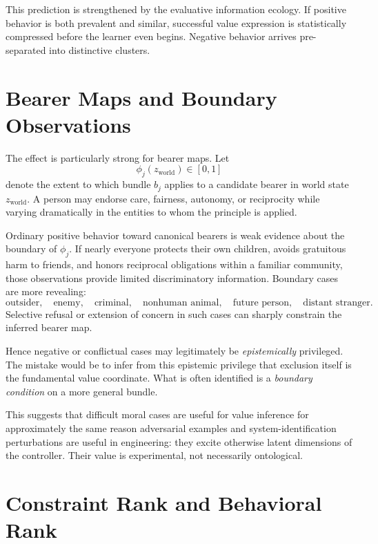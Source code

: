 \documentclass[11pt]{article}
\begin{document}
This prediction is strengthened by the evaluative information ecology. If positive behavior is both prevalent and similar, successful value expression is statistically compressed before the learner even begins. Negative behavior arrives pre-separated into distinctive clusters.

\section{Bearer Maps and Boundary Observations}

The effect is particularly strong for bearer maps. Let
\begin{equation}
    \phi_j(z_{\mathrm{world}})
    \in [0,1]
\end{equation}
denote the extent to which bundle $b_j$ applies to a candidate bearer in world state $z_{\mathrm{world}}$. A person may endorse care, fairness, autonomy, or reciprocity while varying dramatically in the entities to whom the principle is applied.

Ordinary positive behavior toward canonical bearers is weak evidence about the boundary of $\phi_j$. If nearly everyone protects their own children, avoids gratuitous harm to friends, and honors reciprocal obligations within a familiar community, those observations provide limited discriminatory information. Boundary cases are more revealing:
\begin{equation}
    \text{outsider},\quad
    \text{enemy},\quad
    \text{criminal},\quad
    \text{nonhuman animal},\quad
    \text{future person},\quad
    \text{distant stranger}.
\end{equation}
Selective refusal or extension of concern in such cases can sharply constrain the inferred bearer map.

Hence negative or conflictual cases may legitimately be \emph{epistemically} privileged. The mistake would be to infer from this epistemic privilege that exclusion itself is the fundamental value coordinate. What is often identified is a \emph{boundary condition} on a more general bundle.

This suggests that difficult moral cases are useful for value inference for approximately the same reason adversarial examples and system-identification perturbations are useful in engineering: they excite otherwise latent dimensions of the controller. Their value is experimental, not necessarily ontological.

\section{Constraint Rank and Behavioral Rank}
\end{document}

